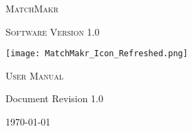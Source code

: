 \begin{titlepage}
	\centering
	\vspace{1in}
	{\scshape\Huge MatchMakr \par}
	{\scshape\Large Software Version 1.0 \par}
	\vspace{1in}
	\texttt{[image: MatchMakr\_Icon\_Refreshed.png]}\par
	\vspace{1in}
	{\scshape\LARGE User Manual\par}
	{Document Revision 1.0\par}
	{\large \today}
\end{titlepage}